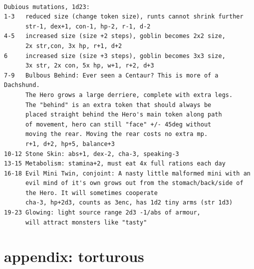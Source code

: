 \

\goodbreak \small \begin{samepage} \begin{verbatim}
Dubious mutations, 1d23:
1-3   reduced size (change token size), runts cannot shrink further
      str-1, dex+1, con-1, hp-2, r-1, d-2
4-5   increased size (size +2 steps), goblin becomes 2x2 size,
      2x str,con, 3x hp, r+1, d+2
6     increased size (size +3 steps), goblin becomes 3x3 size,
      3x str, 2x con, 5x hp, w+1, r+2, d+3
7-9   Bulbous Behind: Ever seen a Centaur? This is more of a Dachshund.
      The Hero grows a large derriere, complete with extra legs.
      The "behind" is an extra token that should always be
      placed straight behind the Hero's main token along path
      of movement, hero can still "face" +/- 45deg without
      moving the rear. Moving the rear costs no extra mp.
      r+1, d+2, hp+5, balance+3
10-12 Stone Skin: abs+1, dex-2, cha-3, speaking-3
13-15 Metabolism: stamina+2, must eat 4x full rations each day
16-18 Evil Mini Twin, conjoint: A nasty little malformed mini with an
      evil mind of it's own grows out from the stomach/back/side of
      the Hero. It will sometimes cooperate
      cha-3, hp+2d3, counts as 3enc, has 1d2 tiny arms (str 1d3)
19-23 Glowing: light source range 2d3 -1/abs of armour,
      will attract monsters like "tasty"
\end{verbatim} \end{samepage} \normalsize
































\clearpage
\section*{appendix: torturous}
\label{appendixtorturous}


